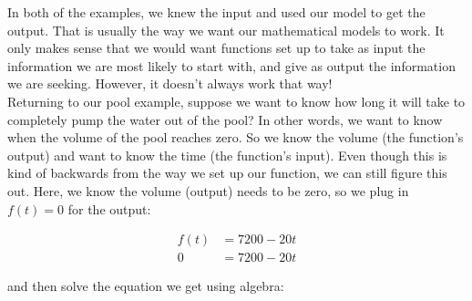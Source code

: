 

\bigskip

In both of the examples, we knew the input and used our model to get the output. That is usually the way we want our mathematical models to work. It only makes sense that we would want functions set up to take as input the information we are most likely to start with, and give as output the information we are seeking. However, it doesn’t always work that way!\\

Returning to our pool example, suppose we want to know how long it will take to completely pump the water out of the pool? In other words, we want to know when the volume of the pool reaches zero. So we know the volume (the function’s output) and want to know the time (the function’s input). Even though this is kind of backwards from the way we set up our function, we can still figure this out. Here, we know the volume (output) needs to be zero, so we plug in $f(t)=0$ for the
output:

\begin{align*}
	f(t)&=7200-20t\\
	0&=7200-20t
\end{align*}

and then solve the equation we get using algebra:

